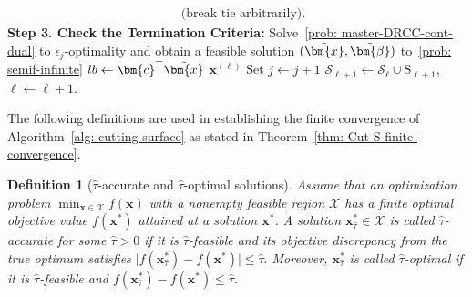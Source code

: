 \documentclass[opre,sglanonrev]{informs4}
\newtheorem{definition}{Definition}
\newcommand{\mS}{\mathcal{S}}
\newcommand{\bbeta}{\bm{\beta}}
\newcommand{\bc}{\bm{c}}
\newcommand{\bs}{\bm{s}}
\newcommand{\bx}{\bm{x}}
\begin{document}
{\begin{algorithm}[t]
\begin{algorithmic}[1]
\begin{align*}
\quad \text{(break tie arbitrarily)}.
\end{align*}
\vspace{-0.5em}
     \State \textbf{Step 3. Check the Termination Criteria:} 
      \If{$J\bigl(\bs^{(\ell+1)};(\bx^{(\ell)},\bbeta^{(\ell)})\bigr)\le \epsilon_j$}
      \State Solve~\eqref{prob: master-DRCC-cont-dual} to $\epsilon_j$-optimality and obtain a feasible solution $(\tilde\bx, \tilde\bbeta)$ to~\eqref{prob: semif-infinite}
      \State $lb \gets \bc^\top \tilde\bx$
        \If{$\bc^\top (\tilde\bx - \bx^{(\ell)}) \leq \hat{\tau}$}
        \State \Return $\bx^{(\ell)}$
        \Else 
        \State Set $j \gets j + 1$
        \EndIf
      \EndIf
    \State $\mS_{\ell+1}\gets \mS_\ell\cup\mathrm{S}_{\ell+1}$,\quad $\ell\gets \ell+1$.
    \EndWhile
  \end{algorithmic}
\end{algorithm}

The following definitions are used in establishing the finite convergence of Algorithm~\ref{alg: cutting-surface} as stated in Theorem~\ref{thm: Cut-S-finite-convergence}.


\begin{definition}[$\hat{\tau}$-accurate and $\hat{\tau}$-optimal solutions]
Assume that an optimization problem $\min_{\bx \in \mathcal{X}} f(\bx)$ with a nonempty feasible region $\mathcal{X}$ has a finite optimal objective value $f(\bx^*)$ attained at a solution $\bx^*$.
A solution $\bx^*_{\hat{\tau}} \in\mathcal{X}$ is called \emph{$\hat{\tau}$-accurate} for some $\hat{\tau} > 0$ if it is $\hat{\tau}$-feasible and its objective discrepancy from the true optimum satisfies \(\big| f(\bx^*_{\hat{\tau}}) - f(\bx^*) \big| \leq \hat{\tau}.\) Moreover,  $\bx^*_{\hat{\tau}}$ is called \emph{$\hat{\tau}$-optimal} if it is $\hat{\tau}$-feasible and \(f(\bx^*_{\hat{\tau}}) - f(\bx^*) \leq \hat{\tau}.\)
\end{definition}


}
\end{document}
